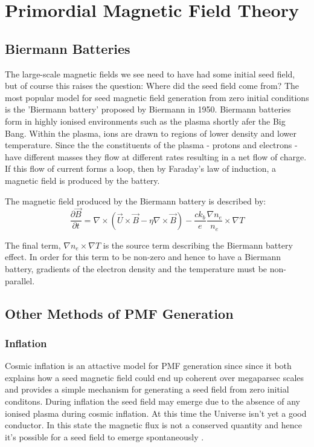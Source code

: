 \section{Primordial Magnetic Field Theory}

\subsection{Biermann Batteries}

The large-scale magnetic fields we see need to have had some initial seed field, but of course this raises the question: Where did the seed field come from? The most popular model for seed magnetic field generation from zero initial conditions is the 'Biermann battery' proposed by Biermann in 1950. Biermann batteries form in highly ionised environments such as the plasma shortly afer the Big Bang. Within the plasma, ions are drawn to regions of lower density and lower temperature. Since the the constituents of the plasma - protons and electrons - have different masses they flow at different rates resulting in a net flow of charge. If this flow of current forms a loop, then by Faraday's law of induction, a magnetic field is produced by the battery.

The magnetic field produced by the Biermann battery is described by:
\begin{equation}
\label{eqn:biermann}
\frac{\partial \vec{B}}{\partial t} = \nabla\times(\vec{U}\times\vec{B}-\eta\nabla \times\vec{B}) - \frac{c k_{b}}{e}\frac{\nabla n_e}{n_e} \times \nabla T
\end{equation}

The final term, $\nabla n_e \times \nabla T$ is the source term describing the Biermann battery effect. In order for this term to be non-zero and hence to have a Biermann battery, gradients of the electron density and the temperature must be non-parallel.

\subsection{Other Methods of PMF Generation}

\subsubsection{Inflation}
Cosmic inflation is an attactive model for PMF generation since since it both explains how a seed magnetic field could end up coherent over megaparsec scales and provides a simple mechanism for generating a seed field from zero initial conditons. During inflation the seed field may emerge due to the absence of any ionised plasma during cosmic inflation. At this time the Universe isn't yet a good conductor. In this state the magnetic flux is not a conserved quantity and hence it's possible for a seed field to emerge spontaneously \cite{PhysRevD.37.2743}.

